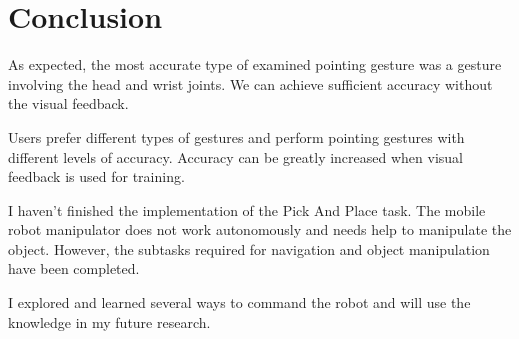 \chapter*{Conclusion}
As expected, the most accurate type of examined pointing gesture was a gesture involving the head and wrist joints. We can achieve sufficient accuracy without the visual feedback.\par
Users prefer different types of gestures and perform pointing gestures with different levels of accuracy. Accuracy can be greatly increased when visual feedback is used for training.\par
I haven't finished the implementation of the Pick And Place task. The mobile robot manipulator does not work autonomously and needs help to manipulate the object. However, the subtasks required for navigation and object manipulation have been completed.\par
I explored and learned several ways to command the robot and will use the knowledge in my future research.\par